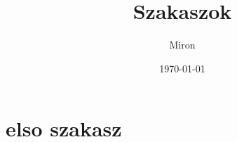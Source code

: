 \title { Szakaszok } 
\author { Miron } 
\date { \today }




\section{elso szakasz}
\maketitle
\label{label}